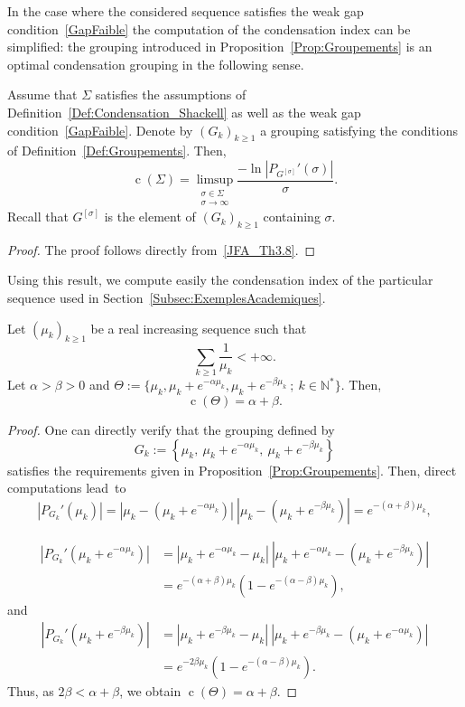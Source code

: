\documentclass[10pt]{amsart}
\theoremstyle{definition}\newtheorem{defi}[theo]{Definition}\newtheorem{rema}[theo]{Remark}\newtheorem{exam}[theo]{Example}\newtheorem{exem}[theo]{Example}\newtheorem{nota}[theo]{Notation}
\newcommand{\N}{\mathbb{N}}
\DeclareMathOperator{\cond}{c}
\begin{document}
In the case where the considered sequence satisfies the weak gap condition~\eqref{GapFaible} the computation of the condensation index can be simplified: the grouping introduced in Proposition~\ref{Prop:Groupements} is an optimal condensation grouping in the following sense.

\begin{prop}\label{Prop:CondensationGapParBloc}
Assume that $\Sigma$ satisfies the assumptions of Definition~\ref{Def:Condensation_Shackell} as well as the weak gap condition~\eqref{GapFaible}. Denote by $(G_k)_{k \geq 1}$ a grouping satisfying the conditions of Definition~\ref{Def:Groupements}. Then,
\[
\cond(\Sigma) = \limsup_{\substack{\sigma \in \Sigma \\ \sigma \to \infty}} \frac{- \ln |P_{G^{[\sigma]}}'(\sigma)| }{\sigma}.
\]
Recall that $G^{[\sigma]}$ is the element of $(G_k)_{k \geq 1}$ containing $\sigma$.
\end{prop}


\begin{proof}
The proof follows directly from~\eqref{JFA_Th3.8}.
\end{proof}


Using this result, we compute easily the condensation index of the particular sequence used in Section~\ref{Subsec:ExemplesAcademiques}.
\begin{prop}
Let $(\mu_k)_{k \geq 1}$ be a real increasing sequence such that
\[
\sum_{k \geq 1} \frac{1}{\mu_k} < + \infty.
\]
Let $\alpha >\beta >0$ and $\Theta := \{ \mu_k, \mu_k + e^{-\alpha \mu_k}, \mu_k + e^{-\beta \mu_k} \: ; \: k \in \N^* \}$. Then,
\[
\cond(\Theta) = \alpha + \beta.
\]
\end{prop}

\begin{proof}
One can directly verify that the grouping defined by
\[
G_k := \left\{ \mu_k, \: \mu_k + e^{-\alpha \mu_k}, \: \mu_k + e^{-\beta \mu_k} \right\}
\]
satisfies the requirements given in Proposition~\ref{Prop:Groupements}. Then, direct computations lead~to
\[
\left|P_{G_k}'(\mu_k)\right| = \left|\mu_k - \left(\mu_k + e^{-\alpha \mu_k}\right)\right| \: \left| \mu_k - \left(\mu_k + e^{-\beta \mu_k}\right)\right| = e^{-(\alpha+\beta) \mu_k},
\]


\begin{align*}
\left|P_{G_k}'\left(\mu_k+ e^{-\alpha \mu_k}\right)\right| &= \left|\mu_k+ e^{-\alpha \mu_k}- \mu_k\right| \: \left| \mu_k+ e^{-\alpha \mu_k} - \left(\mu_k + e^{-\beta \mu_k}\right)\right|
\\
&= e^{-(\alpha+\beta) \mu_k} \left(1 - e^{-(\alpha-\beta)\mu_k} \right),
\end{align*}
and
\begin{align*}
\left|P_{G_k}'\left(\mu_k+ e^{-\beta \mu_k}\right)\right| &= \left|\mu_k+ e^{-\beta \mu_k}- \mu_k\right| \: \left| \mu_k+ e^{-\beta \mu_k} - \left(\mu_k + e^{-\alpha \mu_k}\right)\right|
\\
&= e^{-2\beta \mu_k} \left(1 - e^{-(\alpha-\beta)\mu_k} \right).
\end{align*}
Thus, as $2 \beta < \alpha+ \beta$, we obtain $\cond(\Theta) = \alpha + \beta$.
\end{proof}
\end{document}
